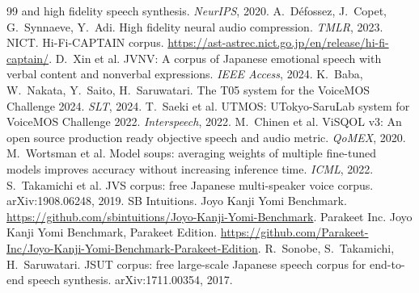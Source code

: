 \documentclass[10pt,a4paper,twocolumn]{article}
\begin{document}
\begin{thebibliography}{99}
and high fidelity speech synthesis. \emph{NeurIPS}, 2020.
 A.~Défossez, J.~Copet, G.~Synnaeve, Y.~Adi. High fidelity neural audio
compression. \emph{TMLR}, 2023.
 NICT. Hi-Fi-CAPTAIN corpus.
\url{https://ast-astrec.nict.go.jp/en/release/hi-fi-captain/}.
 D.~Xin et al. JVNV: A corpus of Japanese emotional speech with verbal content and
nonverbal expressions. \emph{IEEE Access}, 2024.
 K.~Baba, W.~Nakata, Y.~Saito, H.~Saruwatari. The T05 system for the VoiceMOS
Challenge 2024. \emph{SLT}, 2024.
 T.~Saeki et al. UTMOS: UTokyo-SaruLab system for VoiceMOS Challenge 2022.
\emph{Interspeech}, 2022.
 M.~Chinen et al. ViSQOL v3: An open source production ready objective speech and
audio metric. \emph{QoMEX}, 2020.
 M.~Wortsman et al. Model soups: averaging weights of multiple fine-tuned models
improves accuracy without increasing inference time. \emph{ICML}, 2022.
 S.~Takamichi et al. JVS corpus: free Japanese multi-speaker voice corpus.
arXiv:1908.06248, 2019.
 SB Intuitions. Joyo Kanji Yomi Benchmark.
\url{https://github.com/sbintuitions/Joyo-Kanji-Yomi-Benchmark}.
 Parakeet Inc. Joyo Kanji Yomi Benchmark, Parakeet Edition.
\url{https://github.com/Parakeet-Inc/Joyo-Kanji-Yomi-Benchmark-Parakeet-Edition}.
 R.~Sonobe, S.~Takamichi, H.~Saruwatari. JSUT corpus: free large-scale Japanese
speech corpus for end-to-end speech synthesis. arXiv:1711.00354, 2017.
\end{thebibliography}
\end{document}

